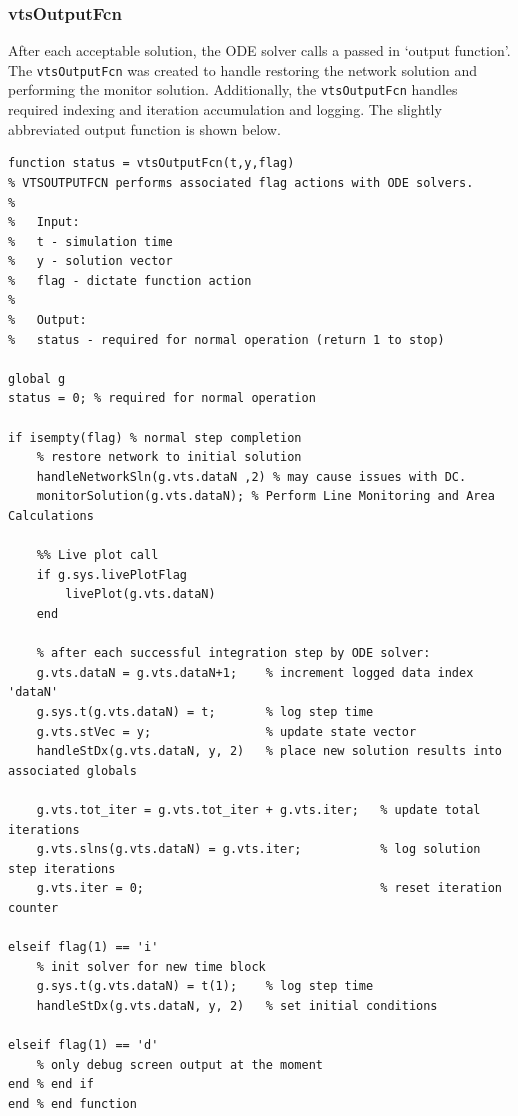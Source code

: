 \subsubsection{vtsOutputFcn} 
After each acceptable solution, the ODE solver calls a passed in `output function'.
The \verb|vtsOutputFcn| was created to handle restoring the network solution and performing the monitor solution.
Additionally, the \verb|vtsOutputFcn| handles required indexing and iteration accumulation and logging.
The slightly abbreviated output function is shown below.
\begin{verbatim}
function status = vtsOutputFcn(t,y,flag)
% VTSOUTPUTFCN performs associated flag actions with ODE solvers.
%
%   Input:
%   t - simulation time
%   y - solution vector
%   flag - dictate function action
%
%   Output:
%   status - required for normal operation (return 1 to stop)

global g 
status = 0; % required for normal operation

if isempty(flag) % normal step completion
    % restore network to initial solution
    handleNetworkSln(g.vts.dataN ,2) % may cause issues with DC.    
    monitorSolution(g.vts.dataN); % Perform Line Monitoring and Area Calculations 
    
    %% Live plot call
    if g.sys.livePlotFlag
        livePlot(g.vts.dataN)
    end
    
    % after each successful integration step by ODE solver:
    g.vts.dataN = g.vts.dataN+1;    % increment logged data index 'dataN'
    g.sys.t(g.vts.dataN) = t;       % log step time
    g.vts.stVec = y;                % update state vector
    handleStDx(g.vts.dataN, y, 2)   % place new solution results into associated globals
    
    g.vts.tot_iter = g.vts.tot_iter + g.vts.iter;   % update total iterations
    g.vts.slns(g.vts.dataN) = g.vts.iter;           % log solution step iterations
    g.vts.iter = 0;                                 % reset iteration counter
    
elseif flag(1) == 'i' 
    % init solver for new time block
    g.sys.t(g.vts.dataN) = t(1);    % log step time
    handleStDx(g.vts.dataN, y, 2)   % set initial conditions
  
elseif flag(1) == 'd'
    % only debug screen output at the moment
end % end if
end % end function
\end{verbatim}



